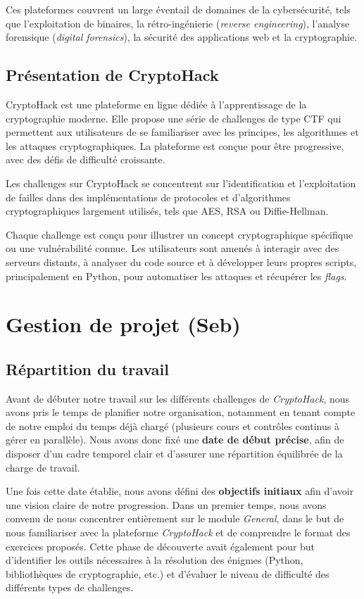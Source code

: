 \documentclass[12pt, a4paper]{article}
\begin{document}
Ces plateformes couvrent un large éventail de domaines de la cybersécurité, tels que l'exploitation de binaires, la rétro-ingénierie (\textit{reverse engineering}), l'analyse forensique (\textit{digital forensics}), la sécurité des applications web et la cryptographie.

\subsection{Présentation de CryptoHack}

CryptoHack est une plateforme en ligne dédiée à l'apprentissage de la cryptographie moderne. Elle propose une série de challenges de type CTF qui permettent aux utilisateurs de se familiariser avec les principes, les algorithmes et les attaques cryptographiques. La plateforme est conçue pour être progressive, avec des défis de difficulté croissante.

Les challenges sur CryptoHack se concentrent sur l'identification et l'exploitation de failles dans des implémentations de protocoles et d'algorithmes cryptographiques largement utilisés, tels que AES, RSA ou Diffie-Hellman. 

Chaque challenge est conçu pour illustrer un concept cryptographique spécifique ou une vulnérabilité connue. Les utilisateurs sont amenés à interagir avec des serveurs distants, à analyser du code source et à développer leurs propres scripts, principalement en Python, pour automatiser les attaques et récupérer les \textit{flags}. 


\section{Gestion de projet (Seb)}
    \subsection{Répartition du travail}
    Avant de débuter notre travail sur les différents challenges de \textit{CryptoHack}, nous avons pris le temps de planifier notre organisation, notamment en tenant compte de notre emploi du temps déjà chargé (plusieurs cours et contrôles continus à gérer en parallèle). Nous avons donc fixé une \textbf{date de début précise}, afin de disposer d’un cadre temporel clair et d’assurer une répartition équilibrée de la charge de travail.

    Une fois cette date établie, nous avons défini des \textbf{objectifs initiaux} afin d’avoir une vision claire de notre progression. Dans un premier temps, nous avons convenu de nous concentrer entièrement sur le module \textit{General}, dans le but de nous familiariser avec la plateforme \textit{CryptoHack} et de comprendre le format des exercices proposés. Cette phase de découverte avait également pour but d’identifier les outils nécessaires à la résolution des énigmes (Python, bibliothèques de cryptographie, etc.) et d’évaluer le niveau de difficulté des différents types de challenges.
\end{document}
